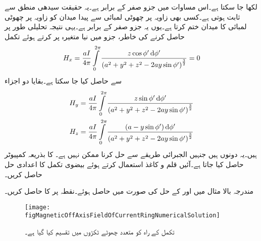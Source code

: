 لکھا جا سکتا ہے۔اس مساوات میں  جزو صفر کے برابر ہے۔یہ حقیقت سیدھی منطق سے ثابت ہوتی ہے۔کسی بھی زاویہ  پر چھوٹی لمبائی سے پیدا میدان کو زاویہ  پر چھوٹی لمبائی کا میدان ختم کرتا ہے۔یوں یہ جزو صفر کے برابر ہے۔یہی نتیجہ تحلیلی طور پر حاصل کرنے کی خاطر،  جزو میں نیا متغیرہ
  پر کرتے ہوئے تکمل
\begin{align*}
H_x=\frac{a I}{4\pi}\int \limits_{0}^{2\pi} \frac{z\cos \phi' \dif \phi'}{\left(a^2+y^2+z^2-2 a y\sin \phi'\right)^{\frac{3}{2}}}=0
\end{align*}
سے حاصل کیا جا سکتا ہے۔بقایا دو اجزاء
\begin{gather}
\begin{aligned}\label{مساوات_مقناطیسی_دائرے_کا_محور_سے_دور_اجزاء}
H_y&=\frac{aI}{4\pi}\int\limits_0^{2\pi} \frac{z\sin \phi' \dif \phi'}{\left(a^2+y^2+z^2-2 a y\sin \phi'\right)^{\frac{3}{2}}}\\
H_z&=\frac{a I}{4\pi}\int \limits_{0}^{2\pi} \frac{(a-y\sin\phi') \dif \phi'}{\left(a^2+y^2+z^2-2 a y\sin \phi'\right)^{\frac{3}{2}}} 
\end{aligned}
\end{gather}
ہیں۔یہ دونوں  ہیں جنہیں الجبرائی طریقے سے حل کرنا ممکن نہیں ہے۔
 کا  بذریعہ کمپیوٹر حاصل کیا جاتا ہے۔آئیں قلم و کاغذ استعمال کرتے ہوئے بیضوی تکمل کا اعدادی حل حاصل کریں۔

مندرجہ بالا مثال میں  اور  کے حل    کی صورت میں حاصل ہوئے۔نقطہ  پر  کا  حاصل کریں۔
\begin{figure}
\centering
\texttt{[image: figMagneticOffAxisFieldOfCurrentRingNumericalSolution]}
\caption{تکمل کے راہ کو متعدد چھوٹے ٹکڑوں میں تقسیم کیا گیا ہے۔}
\label{شکل_مقناطیسی_عددی_حل_دائرہ_برقی_رو}
\end{figure}

